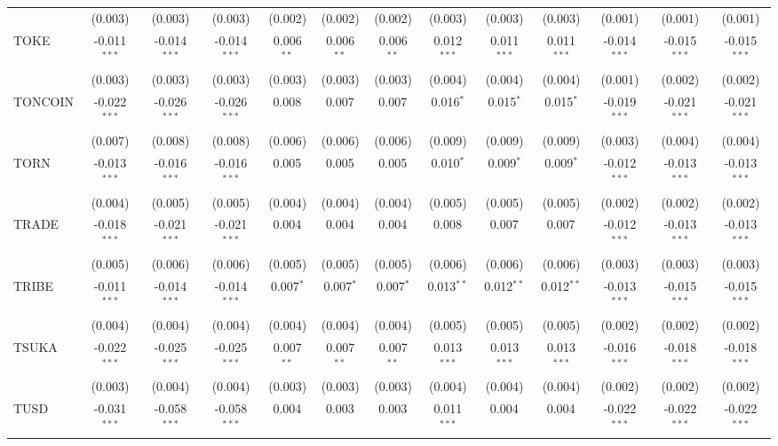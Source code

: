 \begin{table}[!htbp]
\begin{tabular}{@{\extracolsep{5pt}}lcccccccccccc}
  & (0.003) & (0.003) & (0.003) & (0.002) & (0.002) & (0.002) & (0.003) & (0.003) & (0.003) & (0.001) & (0.001) & (0.001) \\
 TOKE & -0.011$^{***}$ & -0.014$^{***}$ & -0.014$^{***}$ & 0.006$^{**}$ & 0.006$^{**}$ & 0.006$^{**}$ & 0.012$^{***}$ & 0.011$^{***}$ & 0.011$^{***}$ & -0.014$^{***}$ & -0.015$^{***}$ & -0.015$^{***}$ \\
  & (0.003) & (0.003) & (0.003) & (0.003) & (0.003) & (0.003) & (0.004) & (0.004) & (0.004) & (0.001) & (0.002) & (0.002) \\
 TONCOIN & -0.022$^{***}$ & -0.026$^{***}$ & -0.026$^{***}$ & 0.008$^{}$ & 0.007$^{}$ & 0.007$^{}$ & 0.016$^{*}$ & 0.015$^{*}$ & 0.015$^{*}$ & -0.019$^{***}$ & -0.021$^{***}$ & -0.021$^{***}$ \\
  & (0.007) & (0.008) & (0.008) & (0.006) & (0.006) & (0.006) & (0.009) & (0.009) & (0.009) & (0.003) & (0.004) & (0.004) \\
 TORN & -0.013$^{***}$ & -0.016$^{***}$ & -0.016$^{***}$ & 0.005$^{}$ & 0.005$^{}$ & 0.005$^{}$ & 0.010$^{*}$ & 0.009$^{*}$ & 0.009$^{*}$ & -0.012$^{***}$ & -0.013$^{***}$ & -0.013$^{***}$ \\
  & (0.004) & (0.005) & (0.005) & (0.004) & (0.004) & (0.004) & (0.005) & (0.005) & (0.005) & (0.002) & (0.002) & (0.002) \\
 TRADE & -0.018$^{***}$ & -0.021$^{***}$ & -0.021$^{***}$ & 0.004$^{}$ & 0.004$^{}$ & 0.004$^{}$ & 0.008$^{}$ & 0.007$^{}$ & 0.007$^{}$ & -0.012$^{***}$ & -0.013$^{***}$ & -0.013$^{***}$ \\
  & (0.005) & (0.006) & (0.006) & (0.005) & (0.005) & (0.005) & (0.006) & (0.006) & (0.006) & (0.003) & (0.003) & (0.003) \\
 TRIBE & -0.011$^{***}$ & -0.014$^{***}$ & -0.014$^{***}$ & 0.007$^{*}$ & 0.007$^{*}$ & 0.007$^{*}$ & 0.013$^{**}$ & 0.012$^{**}$ & 0.012$^{**}$ & -0.013$^{***}$ & -0.015$^{***}$ & -0.015$^{***}$ \\
  & (0.004) & (0.004) & (0.004) & (0.004) & (0.004) & (0.004) & (0.005) & (0.005) & (0.005) & (0.002) & (0.002) & (0.002) \\
 TSUKA & -0.022$^{***}$ & -0.025$^{***}$ & -0.025$^{***}$ & 0.007$^{**}$ & 0.007$^{**}$ & 0.007$^{**}$ & 0.013$^{***}$ & 0.013$^{***}$ & 0.013$^{***}$ & -0.016$^{***}$ & -0.018$^{***}$ & -0.018$^{***}$ \\
  & (0.003) & (0.004) & (0.004) & (0.003) & (0.003) & (0.003) & (0.004) & (0.004) & (0.004) & (0.002) & (0.002) & (0.002) \\
 TUSD & -0.031$^{***}$ & -0.058$^{***}$ & -0.058$^{***}$ & 0.004$^{}$ & 0.003$^{}$ & 0.003$^{}$ & 0.011$^{***}$ & 0.004$^{}$ & 0.004$^{}$ & -0.022$^{***}$ & -0.022$^{***}$ & -0.022$^{***}$ \\

\end{tabular}
\end{table}
